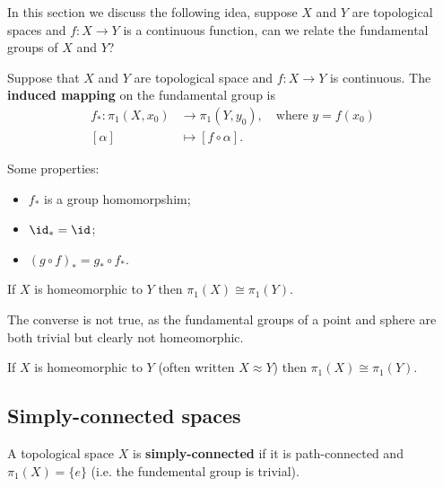 \documentclass[12pt, a4paper]{article}
\begin{document}
\begin{mdnote}
    In this section we discuss the following idea, suppose \(X\) and \(Y\) are topological spaces and \(f:X \to Y\) is a continuous function, can we relate the fundamental groups of \(X\) and \(Y\)?
\end{mdnote}

\begin{definition}
    Suppose that \(X\) and \(Y\) are topological space and \(f:X\to Y\) is continuous. The \textbf{induced mapping} on the fundamental group is 
    \[\begin{aligned}
        f_*:\pi_1(X,x_0)&\to \pi_1(Y,y_0), \quad \text{where } y =f(x_0) \\
        [\alpha] &\mapsto [f\circ \alpha].
    \end{aligned}\]
\end{definition}

\begin{lemma}
    Some properties:
    \begin{itemize}
        \item \(f_*\) is a group homomorpshim;
        \item \(\id_*=\id\);
        \item \((g \circ f)_*=g_*\circ f_*\).
    \end{itemize}
\end{lemma}

\begin{mdcor}
    If \(X\) is homeomorphic to \(Y\) then \(\pi_1(X) \cong \pi_1(Y)\).
\end{mdcor}

\begin{mdremark}
    The converse is not true, as the fundamental groups of a point and sphere are both trivial but clearly not homeomorphic.
\end{mdremark}

\begin{corollary}
    If \(X\) is homeomorphic to \(Y\) (often written \(X \approx Y\)) then \(\pi_1(X) \cong \pi_1(Y)\).
\end{corollary}

\subsection{Simply-connected spaces}

\begin{definition}
    A topological space \(X\) is \textbf{simply-connected} if it is path-connected and \(\pi_1(X)=\{e\}\) (i.e. the fundemental group is trivial).
\end{definition}
\end{document}
